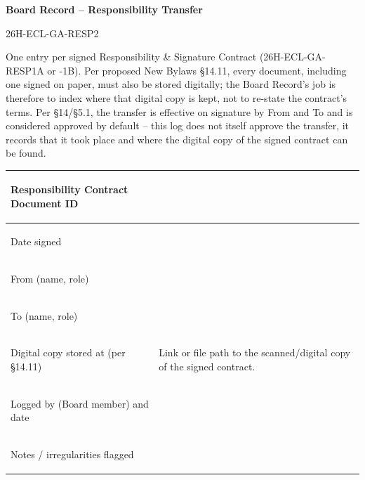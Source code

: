 \documentclass{../../../Common/Latex/Templates/rapport}
\date{\meetingdate, \meetingtime}
\begin{document}
\reportmainmatter
\small
\setlength{\parindent}{0pt}
\setlength{\tabcolsep}{6pt}
\renewcommand{\arraystretch}{1.2}

\begin{center}
  {\Large\bfseries Board Record -- Responsibility Transfer}\par
  \vspace{0.15cm}
  {\normalsize 26H-ECL-GA-RESP2}\par
  \vspace{0.1cm}
  {\small \meetingline}\par
\end{center}

\vspace{0.2cm}
One entry per signed Responsibility \& Signature Contract (26H-ECL-GA-RESP1A or -1B). Per proposed New Bylaws \S14.11, every document, including one signed on paper, must also be stored digitally; the Board Record's job is therefore to index where that digital copy is kept, not to re-state the contract's terms. Per \S14/\S5.1, the transfer is effective on signature by From and To and is considered approved by default -- this log does not itself approve the transfer, it records that it took place and where the digital copy of the signed contract can be found.

\vspace{0.4cm}
\begin{tabularx}{\textwidth}{|>{\bfseries\raggedright\arraybackslash}p{4.4cm}|X|}
  \hline
  Responsibility Contract Document ID  & \rule{0pt}{1cm}                                                                        \\
  \hline
  Date signed                          & \rule{0pt}{0.9cm}                                                                      \\
  \hline
  From (name, role)                    & \rule{0pt}{0.9cm}                                                                      \\
  \hline
  To (name, role)                      & \rule{0pt}{0.9cm}                                                                      \\
  \hline
  Digital copy stored at (per \S14.11) & \rule{0pt}{1.2cm}Link or file path to the scanned/digital copy of the signed contract. \\
  \hline
  Logged by (Board member) and date    & \rule{0pt}{1.2cm}                                                                      \\
  \hline
  Notes / irregularities flagged       & \rule{0pt}{1.6cm}                                                                      \\
  \hline
\end{tabularx}
\end{document}

